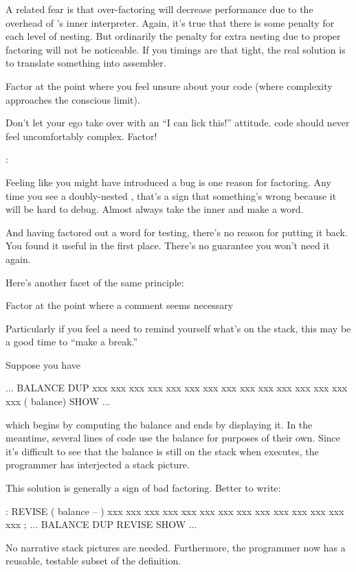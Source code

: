 A related fear is that over-factoring will decrease performance due to
the overhead of \Forth{}'s inner interpreter. Again, it's true that
there is some penalty for each level of nesting. But ordinarily the
penalty for extra nesting due to proper factoring will not be
noticeable. If you timings are that tight, the real solution is to
translate something into assembler.

\begin{tip}
Factor at the point where you feel unsure about your code (where
complexity approaches the conscious limit).
\end{tip}
Don't let your ego take over with an ``I can lick this!'' attitude.
\Forth{} code should never feel uncomfortably complex. Factor!

\begin{interview}
:

\begin{tfquot}
Feeling like you might have introduced a bug is one reason for
factoring. Any time you see a doubly-nested , that's a
sign that something's wrong because it will be hard to debug. Almost
always take the inner  and make a word.

And having factored out a word for testing, there's no reason for
putting it back. You found it useful in the first place. There's no
guarantee you won't need it again.
\end{tfquot}
\end{interview}
Here's another facet of the same principle:

\begin{tip}
Factor at the point where a comment seems necessary
\end{tip}
Particularly if you feel a need to remind yourself what's on the
stack, this may be a good time to ``make a break.''

\goodbreak
Suppose you have
\begin{Code}
... BALANCE  DUP xxx xxx xxx xxx xxx xxx xxx xxx xxx
     xxx xxx xxx xxx xxx xxx   ( balance) SHOW  ...
\end{Code}
which begins by computing the balance and ends by displaying it. In
the meantime, several lines of code use the balance for purposes of
their own. Since it's difficult to see that the balance is still on
the stack when  executes, the programmer has interjected a
stack picture.

This solution is generally a sign of bad factoring. Better to write:
\begin{Code}
: REVISE  ( balance -- )  xxx xxx xxx xxx xxx xxx xxx
     xxx xxx xxx xxx xxx xxx xxx ;
... BALANCE  DUP REVISE  SHOW  ...
\end{Code}
No narrative stack pictures are needed. Furthermore, the programmer
now has a reusable, testable subset of the definition.

